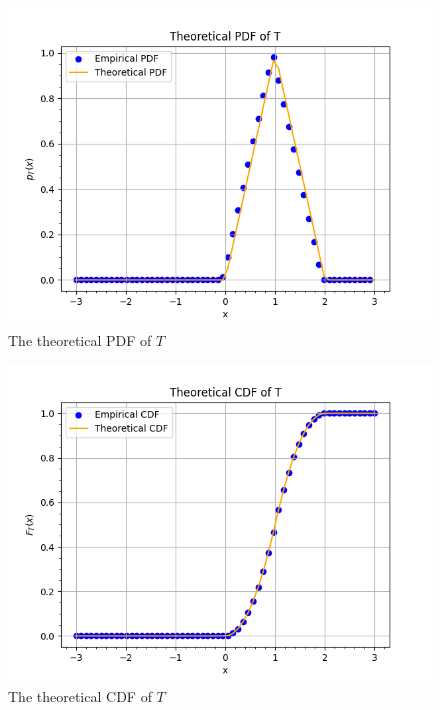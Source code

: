 \documentclass[journal,12pt,twocolumn]{IEEEtran}
\renewcommand\thesection{\arabic{section}}
\begin{document}
\begin{enumerate}[label=\thesection.\arabic*
,ref=\thesection.\theenumi]
\begin{figure}[ht!]
    \includegraphics[width=\columnwidth]{./figs/fig4.5.png}
    \caption{The theoretical PDF of $T$}
    \label{fig:theory_tri_pdf}
\end{figure}
\begin{figure}[ht!]
    \centering
    \includegraphics[width=\columnwidth]{./figs/fig4.5b.png}
    \caption{The theoretical CDF of $T$}
    \label{fig:theory_tri_cdf}
\end{figure}
%
\end{enumerate}
\end{document}
